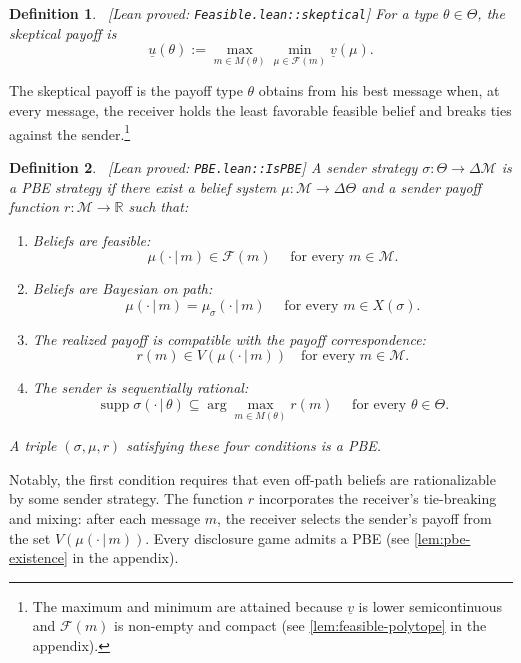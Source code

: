 \documentclass[11pt]{article}
\newtheorem{definition}{Definition}
\newcommand{\sep}{\,|\,}
\newcommand{\supp}{\operatorname{supp}}
\newcommand{\Msg}{\mathcal{M}}
\newcommand{\leanproved}[1]{{\footnotesize\textsf{\textcolor{green!55!black}{[Lean proved: \texttt{#1}]}}}}
\begin{document}
\begin{definition}\label{dfn:skeptical-payoff}\ \leanproved{Feasible.lean::skeptical}
    For a type $\theta \in \Theta$, the \emph{skeptical payoff} is
    \[
        \underline{u}(\theta) := \max_{m \in M(\theta)} \min_{\mu \in \mathcal{F}(m)} \underline{v}(\mu).
    \]
\end{definition}
 The skeptical payoff is the payoff type $\theta$ obtains from his best message when, at every message, the receiver holds the least favorable feasible belief and breaks ties against the sender.\footnote{The maximum and minimum are attained because $\underline{v}$ is lower semicontinuous and $\mathcal{F}(m)$ is non-empty and compact (see \cref{lem:feasible-polytope} in the appendix).}

\begin{definition}\label{dfn:PBE}\ \leanproved{PBE.lean::IsPBE}
    A sender strategy $\sigma: \Theta \to \Delta \Msg$ is a \emph{PBE strategy} if there exist a belief system $\mu: \Msg \to \Delta \Theta$ and a sender payoff function $r: \Msg \to \mathbb{R}$ such that:
    \begin{enumerate}
        \item Beliefs are feasible:
        \[
            \mu(\cdot \sep m) \in \mathcal{F}(m) \quad \text{ for every } m \in \Msg.
        \]
        \item Beliefs are Bayesian on path:
        \[
            \mu(\cdot \sep m) = \mu_\sigma(\cdot \sep m) \quad \text{ for every } m \in X(\sigma).
        \]
        \item The realized payoff is compatible with the payoff correspondence:
        \[
            r(m) \in V(\mu(\cdot \sep m)) \quad \text{for every } m \in \Msg.
        \]
        \item The sender is sequentially rational:
        \[
            \supp \sigma(\cdot \sep \theta) \subseteq \arg\max_{m \in M(\theta)} r(m) \quad \text{ for every } \theta \in \Theta.
        \]
    \end{enumerate}
    A triple $(\sigma,\mu,r)$ satisfying these four conditions is a \emph{PBE}.
\end{definition}
Notably, the first condition requires that even off-path beliefs are rationalizable by some sender strategy. The function $r$ incorporates the receiver's tie-breaking and mixing: after each message $m$, the receiver selects the sender's payoff from the set $V(\mu(\cdot\sep m))$.
Every disclosure game admits a PBE (see \cref{lem:pbe-existence} in the appendix).
\end{document}
